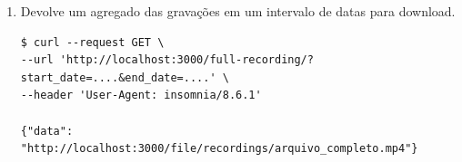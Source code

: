\documentclass[12pt, %
openright, 
oneside, %
a4paper,    %
brazil]{facom-ufu-abntex2}
\begin{document}
\begin{apendicesenv}
\begin{enumerate}
		\item Devolve um agregado das gravações em um intervalo de
		      datas para
		      download.

			      {
				      \footnotesize
				      \begin{verbatim}
$ curl --request GET \
--url 'http://localhost:3000/full-recording/?start_date=....&end_date=....' \
--header 'User-Agent: insomnia/8.6.1'

{"data": "http://localhost:3000/file/recordings/arquivo_completo.mp4"}
\end{verbatim}
			      }

	\end{enumerate}

\end{apendicesenv}


\printindex
\end{document}
